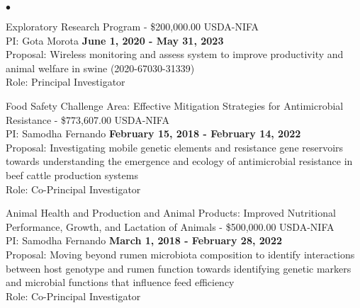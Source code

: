 \documentclass[margin,line,10pt]{res}
\newenvironment{list2}{
  \begin{list}{$\bullet$}{%
      \setlength{\itemsep}{0in}
      \setlength{\parsep}{0in} \setlength{\parskip}{0in}
      \setlength{\topsep}{0in} \setlength{\partopsep}{0in} 
      \setlength{\leftmargin}{0.2in}}}{\end{list}}
\begin{document}
\begin{resume}
\begin{list2}
\vspace{0.5cm}


\item Exploratory Research Program - \$200,000.00  \hfill USDA-NIFA \\
  PI: Gota Morota   \hfill \textbf{June 1, 2020 -  May 31, 2023}\\
Proposal: Wireless monitoring and assess system to improve productivity and animal welfare in swine (2020-67030-31339) \\
Role: Principal Investigator \\


\vspace{0.5cm}


\item Food Safety Challenge Area: Effective Mitigation Strategies for Antimicrobial Resistance  - \$773,607.00  \hfill USDA-NIFA\\
PI: Samodha Fernando   \hfill \textbf{February 15, 2018 - February 14, 2022}\\
Proposal: Investigating mobile genetic elements and resistance gene reservoirs towards understanding the emergence and ecology of antimicrobial resistance in beef cattle production systems  \\
Role: Co-Principal Investigator \\

\vspace{0.5cm}

\item Animal Health and Production and Animal Products: Improved Nutritional Performance, Growth, and Lactation of Animals  - \$500,000.00  \hfill USDA-NIFA\\
PI: Samodha Fernando   \hfill \textbf{March 1, 2018 - February 28, 2022}\\
Proposal: Moving beyond rumen microbiota composition to identify interactions between host genotype and rumen function towards identifying genetic markers and microbial functions that influence feed efficiency  \\
Role: Co-Principal Investigator \\

\vspace{0.5cm}






\end{list2}
\end{resume}
\end{document}
